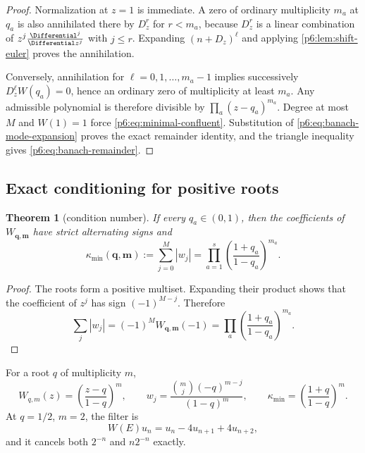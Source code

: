 \documentclass[11pt]{article}
\numberwithin{equation}{section}
\newtheorem{theorem}{Theorem}[section]
\theoremstyle{definition}
\theoremstyle{remark}
\begin{document}
\begin{proof}
Normalization at $z=1$ is immediate.  A zero of ordinary multiplicity $m_a$ at $q_a$
is also annihilated there by $D_z^r$ for $r<m_a$, because $D_z^r$ is a linear
combination of $z^j\frac{\Differential^j}{\Differential z^j}$ with $j\le r$.  Expanding
$(n+D_z)^\ell$ and applying \cref{p6:lem:shift-euler} proves the annihilation.

Conversely, annihilation for $\ell=0,1,\ldots,m_a-1$ implies successively
$D_z^\ell W(q_a)=0$, hence an ordinary zero of multiplicity at least $m_a$.  Any
admissible polynomial is therefore divisible by $\prod_a(z-q_a)^{m_a}$.  Degree at most
$M$ and $W(1)=1$ force \eqref{p6:eq:minimal-confluent}.  Substitution of
\eqref{p6:eq:banach-mode-expansion} proves the exact remainder identity, and the triangle
inequality gives \eqref{p6:eq:banach-remainder}.
\end{proof}

\subsection{Exact conditioning for positive roots}

\begin{theorem}[condition number]
\label{p6:thm:minimal-condition}
If every $q_a\in(0,1)$, then the coefficients of
$W_{\bm q,\bm m}$ have strict alternating signs and
\begin{equation}
 \kappa_{\min}(\bm q,\bm m)
 :=\sum_{j=0}^{M}|w_j|
 =\prod_{a=1}^{s}\left(\frac{1+q_a}{1-q_a}\right)^{m_a}.
 \label{p6:eq:minimal-condition}
\end{equation}
\end{theorem}

\begin{proof}
The roots form a positive multiset.  Expanding their product shows that the coefficient
of $z^j$ has sign $(-1)^{M-j}$.  Therefore
\[
 \sum_j|w_j|=(-1)^MW_{\bm q,\bm m}(-1)
 =\prod_a\left(\frac{1+q_a}{1-q_a}\right)^{m_a}.
\]
\end{proof}

\begin{example}
For a root $q$ of multiplicity $m$,
\begin{equation}
 W_{q,m}(z)=\left(\frac{z-q}{1-q}\right)^m,
 \qquad
 w_j=\frac{\binom mj(-q)^{m-j}}{(1-q)^m},
 \qquad
 \kappa_{\min}=\left(\frac{1+q}{1-q}\right)^m.
 \label{p6:eq:single-root-filter}
\end{equation}
At $q=1/2$, $m=2$, the filter is
\[
 W(E)u_n=u_n-4u_{n+1}+4u_{n+2},
\]
and it cancels both $2^{-n}$ and $n2^{-n}$ exactly.
\end{example}
\end{document}

